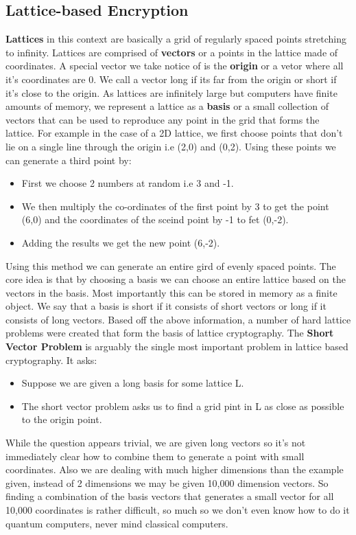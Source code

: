 \documentclass[10pt,a4paper]{article}
\begin{document}
\subsection{Lattice-based Encryption}
\textbf{Lattices} in this context are basically a grid of regularly spaced points stretching to infinity. Lattices are comprised of \textbf{vectors} or a points in the lattice made of coordinates. A special vector we take notice of is the \textbf{origin} or a vetor where all it's coordinates are 0. We call a vector long if its far from the origin or short if it's close to the origin. As lattices are infinitely large but computers have finite amounts of memory, we represent a lattice as a \textbf{basis} or a small collection of vectors that can be used to reproduce any point in the grid that forms the lattice.
\newline
For example in the case of a 2D lattice, we first choose points that don't lie on a single line through the origin i.e (2,0) and (0,2). Using these points we can generate a third point by:
\begin{itemize}
\item First we choose 2 numbers at random i.e 3 and -1.
\item We then multiply the co-ordinates of the first point by 3 to get the point (6,0) and the coordinates of the sceind point by -1 to fet (0,-2).
\item Adding the results we get the new point (6,-2).
\end{itemize}
Using this method we can generate an entire gird of evenly spaced points. The core idea is that by choosing a basis we can choose an entire lattice based on the vectors in the basis. Most importantly this can be stored in memory as a finite object. We say that a basis is short if it consists of short vectors or long if it consists of long vectors.
\newline
\newline
Based off the above information, a number of hard lattice problems were created that form the basis of lattice cryptography. The \textbf{Short Vector Problem} is arguably the single most important problem in lattice based cryptography. It asks:
\begin{itemize}
\item Suppose we are given a long basis for some lattice L.
\item The short vector problem asks us to find a grid pint in L as close as possible to the origin point.
\end{itemize}
While the question appears trivial, we are given long vectors so it's not immediately clear how to combine them to generate a point with small coordinates. Also we are dealing with much higher dimensions than the example given, instead of 2 dimensions we may be given 10,000 dimension vectors. So finding a combination of the basis vectors that generates a small vector for all 10,000 coordinates is rather difficult, so much so we don't even know how to do it quantum computers, never mind classical computers.
\end{document}
